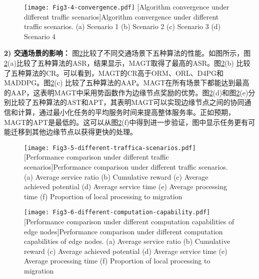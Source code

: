 \begin{figure}[h]
\centering
  \texttt{[image: Fig3-4-convergence.pdf]}
  [Algorithm convergence under different traffic scenarios]{Algorithm convergence under different traffic scenarios. (a) Scenario 1 (b) Scenario 2 (c) Scenario 3 (d) Scenario 4}
  \label{fig 3-4}
\end{figure} 

\textbf{2) 交通场景的影响：} 图\ref{fig 3-5}比较了不同交通场景下五种算法的性能。如图所示，图\ref{fig 3-5}(a)比较了五种算法的ASR，结果显示，MAGT取得了最高的ASR。图\ref{fig 3-5}(b) 比较了五种算法的CR。可以看到，MAGT的CR高于ORM、ORL、D4PG和MADDPG。图\ref{fig 3-5}(c) 比较了五种算法的AAP。MAGT在所有场景下都能达到最高的AAP，这表明MAGT中采用势函数作为边缘节点奖励的优势。图\ref{fig 3-5}(d)和图\ref{fig 3-5}(e)分别比较了五种算法的AST和APT，其表明MAGT可以实现边缘节点之间的协同通信和计算，通过最小化任务的平均服务时间来提高整体服务率。正如预期，MAGT的APT是最低的。这可以从图\ref{fig 3-5}(f)中得到进一步验证，图中显示任务更有可能迁移到其他边缘节点以获得更快的处理。

\begin{figure}[h]
\centering
  \texttt{[image: Fig3-5-different-traffica-scenarios.pdf]}
  [Performance comparison under different traffic scenarios]{Performance comparison under different traffic scenarios. (a) Average service ratio (b) Cumulative reward (c) Average achieved potential (d) Average service time (e) Average processing time (f) Proportion of local processing to migration}
  \label{fig 3-5}
\end{figure}

\begin{figure}[h]
\centering
  \texttt{[image: Fig3-6-different-computation-capability.pdf]}
  [Performance comparison under different computation capabilities of edge nodes]{Performance comparison under different computation capabilities of edge nodes. (a) Average service ratio (b) Cumulative reward (c) Average achieved potential (d) Average service time (e) Average processing time (f) Proportion of local processing to migration}
  \label{fig 3-6}
\end{figure}

